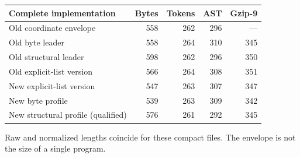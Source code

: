 \begin{center}
\small
\begin{tabular}{lrrrr}
\toprule
Complete implementation & Bytes & Tokens & AST & Gzip-9\\
\midrule
Old coordinate envelope & 558 & 262 & 296 & ---\\
\midrule
Old byte leader & 558 & 264 & 310 & 345\\
Old structural leader & 598 & 262 & 296 & 350\\
Old explicit-list version & 566 & 264 & 308 & 351\\
\midrule
New explicit-list version & 547 & 263 & 307 & 347\\
New byte profile & 539 & 263 & 309 & 342\\
New structural profile (qualified) & 576 & 261 & 292 & 345\\
\bottomrule
\end{tabular}
\end{center}
Raw and normalized lengths coincide for these compact files. The envelope
is not the size of a single program.

